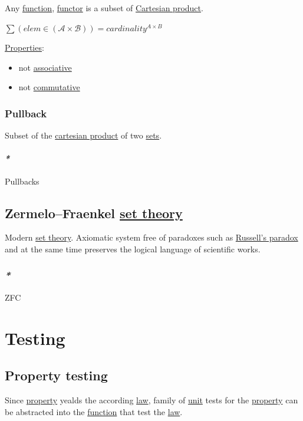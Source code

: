 \documentclass[a4paper,14pt,oneside]{book}
\begin{document}
Any \hyperref[orgbcd9d18]{function}, \hyperref[orgb7e8a69]{functor} is a subset of \hyperref[org8a90985]{Cartesian product}.

\(\sum{(elem \in (\mathcal{A} \times \mathcal{B}))}  = cardinality^{A \times B}\)

\hyperref[orgcc131cf]{Properties}:
\begin{itemize}
\item not \hyperref[orgcf2a646]{associative}
\item not \hyperref[org70520d1]{commutative}
\end{itemize}

\subsection{\label{org82be34b}Pullback}
\label{sec:orgdb68ce9}
Subset of the \hyperref[org8a90985]{cartesian product} of two \hyperref[org27f929c]{sets}.

\subsubsection{\emph{*}}
\label{sec:org126ae7c}
\label{org4eb087f}Pullbacks

\section{Zermelo–Fraenkel \hyperref[org672d687]{set theory}}
\label{sec:orgcb594d4}
Modern \hyperref[org672d687]{set theory}. Axiomatic system free of paradoxes such as \hyperref[orgc33a0e6]{Russell's paradox} and at the same time preserves the logical language of scientific works.

\subsection{\emph{*}}
\label{sec:org4ddaeb8}

\label{org456e875}ZFC

\chapter{\label{orgdc5a94b}Testing}
\label{sec:org0b4eb1d}
\section{\label{org97132f1}Property testing}
\label{sec:org2e29beb}

Since \hyperref[orgb6e81ca]{property} yealds the according \hyperref[org150d912]{law}, family of \hyperref[orga626f14]{unit} tests for the \hyperref[orgb6e81ca]{property} can be abstracted into the \hyperref[orgbcd9d18]{function} that test the \hyperref[org150d912]{law}.
\end{document}
